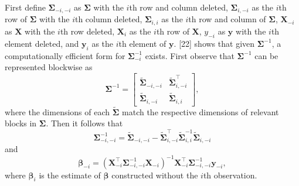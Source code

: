 \documentclass[10pt,letterpaper]{article}
\begin{document}
First define \(\boldsymbol{\Sigma}_{-i, -i}\) as \(\boldsymbol{\Sigma}\)
with the \(i\)th row and column deleted, \(\boldsymbol{\Sigma}_{i, -i}\)
as the \(i\)th row of \(\boldsymbol{\Sigma}\) with the \(i\)th column
deleted, \(\boldsymbol{\Sigma}_{i, i}\) as the \(i\)th row and column of
\(\boldsymbol{\Sigma}\), \(\mathbf{X}_{-i}\) as \(\mathbf{X}\) with the
\(i\)th row deleted, \(\mathbf{X}_{i}\) as the \(i\)th row of
\(\mathbf{X}\), \(y_{-i}\) as \(\mathbf{y}\) with the \(i\)th element
deleted, and \(\mathbf{y}_i\) as the \(i\)th element of \(\mathbf{y}\).
{[}22{]} shows that given \(\boldsymbol{\Sigma}^{-1}\), a
computationally efficient form for \(\boldsymbol{\Sigma}^{-1}_{-i}\)
exists. First observe that \(\boldsymbol{\Sigma}^{-1}\) can be
represented blockwise as \begin{equation*}
 \boldsymbol{\Sigma}^{-1} = 
 \begin{bmatrix}
  \tilde{\boldsymbol{\Sigma}}_{-i, -i} & \tilde{\boldsymbol{\Sigma}}_{i,-i}^\top \\
  \tilde{\boldsymbol{\Sigma}}_{i,-i} & \tilde{\boldsymbol{\Sigma}}_{i, i}
 \end{bmatrix},
\end{equation*} where the dimensions of each
\(\tilde{\boldsymbol{\Sigma}}\) match the respective dimensions of
relevant blocks in \(\boldsymbol{\Sigma}\). Then it follows that
\begin{equation*}
 \boldsymbol{\Sigma}^{-1}_{-i, -i} = \tilde{\boldsymbol{\Sigma}}_{-i, -i} - \tilde{\boldsymbol{\Sigma}}_{i,-i}^\top \tilde{\boldsymbol{\Sigma}}_{i, i}^{-1}\tilde{\boldsymbol{\Sigma}}_{i,-i}
\end{equation*} and \begin{equation*}
  \boldsymbol{\beta}_{-i} = (\mathbf{X}^\top_{-i} \boldsymbol{\Sigma}^{-1}_{-i, -i} \mathbf{X}_{-i})^{-1} \mathbf{X}^\top_{-i} \boldsymbol{\Sigma}^{-1}_{-i, -i} \mathbf{y}_{-i},
\end{equation*} where \(\boldsymbol{\beta}_i\) is the estimate of
\(\boldsymbol{\beta}\) constructed without the \(i\)th observation.
\end{document}
